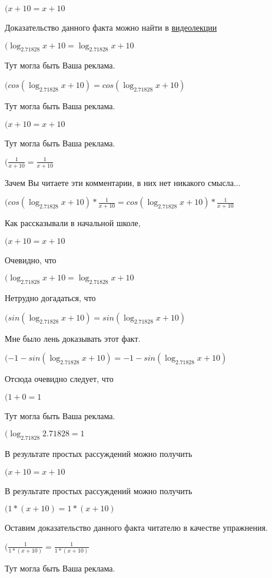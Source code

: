 \documentclass[12pt,a4paper,fleqn]{article}
\theoremstyle{definition}
\begin{document}
$( x  +  10  =  x  +  10 $

Доказательство данного факта можно найти в \href{https://www.youtube.com/watch?v=dQw4w9WgXcQ}{видеолекции}

$(\log_{ 2.71828 }{ x  +  10 } = \log_{ 2.71828 }{ x  +  10 }$

Тут могла быть Ваша реклама.

$(cos(\log_{ 2.71828 }{ x  +  10 }) = cos(\log_{ 2.71828 }{ x  +  10 })$

Тут могла быть Ваша реклама.

$( x  +  10  =  x  +  10 $

Тут могла быть Ваша реклама.

$(\frac{ 1 }{ x  +  10 }
 = \frac{ 1 }{ x  +  10 }
$

Зачем Вы читаете эти комментарии, в них нет никакого смысла...

$(cos(\log_{ 2.71828 }{ x  +  10 }) * \frac{ 1 }{ x  +  10 }
 = cos(\log_{ 2.71828 }{ x  +  10 }) * \frac{ 1 }{ x  +  10 }
$

Как рассказывали в начальной школе,

$( x  +  10  =  x  +  10 $

Очевидно, что

$(\log_{ 2.71828 }{ x  +  10 } = \log_{ 2.71828 }{ x  +  10 }$

Нетрудно догадаться, что

$(sin(\log_{ 2.71828 }{ x  +  10 }) = sin(\log_{ 2.71828 }{ x  +  10 })$

Мне было лень доказывать этот факт.

$( -1  - sin(\log_{ 2.71828 }{ x  +  10 }) =  -1  - sin(\log_{ 2.71828 }{ x  +  10 })$

Отсюда очевидно следует, что

$( 1  +  0  =  1 $

Тут могла быть Ваша реклама.

$(\log_{ 2.71828 }{ 2.71828 } =  1 $

В результате простых рассуждений можно получить

$( x  +  10  =  x  +  10 $

В результате простых рассуждений можно получить

$( 1  * ( x  +  10 ) =  1  * ( x  +  10 )$

Оставим доказательство данного факта читателю в качестве упражнения.

$(\frac{ 1 }{ 1  * ( x  +  10 )}
 = \frac{ 1 }{ 1  * ( x  +  10 )}
$

Тут могла быть Ваша реклама.
\end{document}
